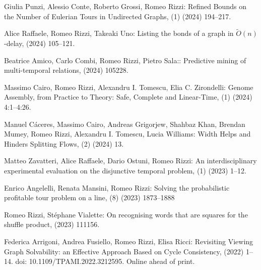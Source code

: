 \begin{etaremune}
  \vspace{-3.0mm}
  \item {\sc Giulia Punzi, Alessio Conte, Roberto Grossi, Romeo Rizzi:}
   \newblock Refined Bounds on the Number of Eulerian Tours in Undirected Graphs,
   (1) (2024) 194--217.
   
  \item {\sc Alice Raffaele, Romeo Rizzi, Takeaki Uno:}
   \newblock Listing the bonds of a graph in $\tilde{O}(n)$-delay,
    (2024) 105--121.
   
  \item {\sc Beatrice Amico, Carlo Combi, Romeo Rizzi, Pietro Sala::}
   \newblock Predictive mining of multi-temporal relations,
    (2024) 105228.
   
  \item {\sc Massimo Cairo, Romeo Rizzi, Alexandru I. Tomescu, Elia C. Zirondelli:}
   \newblock Genome Assembly, from Practice to Theory: Safe, Complete and Linear-Time,
   (1) (2024) 4:1--4:26.
   
  \item {\sc Manuel Cáceres, Massimo Cairo, Andreas Grigorjew, Shahbaz Khan, Brendan Mumey, Romeo Rizzi, Alexandru I. Tomescu, Lucia Williams:}
   \newblock Width Helps and Hinders Splitting Flows,
   (2) (2024) 13.
   
  \item {\sc Matteo Zavatteri, Alice Raffaele, Dario Ostuni, Romeo Rizzi:}
   \newblock An interdisciplinary experimental evaluation on the disjunctive temporal problem,
   (1) (2023) 1--12.

  \item {\sc Enrico Angelelli, Renata Mansini, Romeo Rizzi:}
   \newblock Solving the probabilistic profitable tour problem on a line,
   (8) (2023) 1873--1888

  \item {\sc Romeo Rizzi, Stéphane Vialette:}
   \newblock On recognising words that are squares for the shuffle product,
    (2023) 111156.

  \item {\sc Federica Arrigoni, Andrea Fusiello, Romeo Rizzi, Elisa Ricci:}
   \newblock Revisiting Viewing Graph Solvability: an Effective Approach Based on Cycle Consistency,
   \newblock  (2022) 1--14.
   \newblock  doi: 10.1109/TPAMI.2022.3212595. Online ahead of print.


\end{etaremune}
